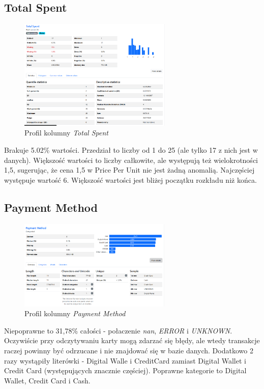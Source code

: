 \documentclass[a4paper,12pt]{article}
\begin{document}
\subsection{Total Spent}

\begin{figure}[H]
  \centering
  \includegraphics[width=0.65\textwidth]{images/py_5.png}
  \caption{Profil kolumny \textit{Total Spent}}
\end{figure}

Brakuje 5.02\% wartości. Przedział to liczby od 1 do 25 (ale tylko 17 z nich jest w danych). Większość wartości to liczby całkowite, ale występują też wielokrotności 1,5, sugerując, że cena 1,5 w Price Per Unit nie jest żadną anomalią. Najczęściej występuje wartość 6. Większość wartości jest bliżej początku rozkładu niż końca.

\subsection{Payment Method}

\begin{figure}[H]
  \centering
  \includegraphics[width=0.65\textwidth]{images/py_6.png}
  \caption{Profil kolumny \textit{Payment Method}}
\end{figure}

Niepoprawne to 31,78\% całości - połaczenie \textit{nan}, \textit{ERROR} i \textit{UNKNOWN}. Oczywiście przy odczytywaniu karty mogą zdarzać się błędy, ale wtedy transakcje raczej powinny być odrzucane i nie znajdować się w bazie danych. Dodatkowo 2 razy wystąpiły literówki - Digital Walle i CreditCard zamiast Digital Wallet i Credit Card (występujących znacznie częściej). Poprawne kategorie to Digital Wallet, Credit Card	i Cash.
\end{document}
